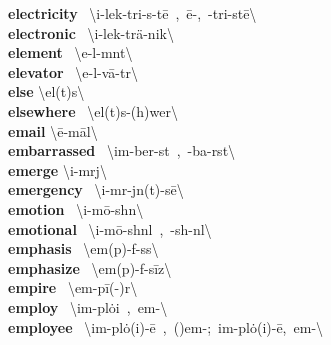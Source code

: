 \documentclass[10pt,a4paper]{article}
\begin{document}
\begin{multicols}{2}
\textbf{ electricity }\quad \ \textbackslash i-\textsecstress lek-\textprimstress tri-s\textschwa -t\={e}\ ,\ \={e}-,\ -\textprimstress tri-st\={e}\textbackslash \\
\textbf{ electronic }\quad \ \textbackslash i-\textsecstress lek-\textprimstress tr\"{a}-nik\textbackslash \\
\textbf{ element }\quad \ \textbackslash \textprimstress e-l\textschwa -m\textschwa nt\textbackslash \\
\textbf{ elevator }\quad \ \textbackslash \textprimstress e-l\textschwa -\textsecstress v\={a}-t\textschwa r\textbackslash \\
\textbf{ else }\quad \textbackslash \textprimstress el(t)s\textbackslash \\
\textbf{ elsewhere }\quad \ \textbackslash \textprimstress el(t)s-\textsecstress (h)wer\textbackslash \\
\textbf{ email }\quad \textbackslash \textprimstress \={e}-\textsecstress m\={a}l\textbackslash \\
\textbf{ embarrassed }\quad \ \textbackslash im-\textprimstress ber-\textschwa st\ ,\ -\textprimstress ba-r\textschwa st\textbackslash \\
\textbf{ emerge }\quad \textbackslash i-\textprimstress m\textschwa rj\textbackslash \\
\textbf{ emergency }\quad \ \textbackslash i-\textprimstress m\textschwa r-j\textschwa n(t)-s\={e}\textbackslash \\
\textbf{ emotion }\quad \ \textbackslash i-\textprimstress m\={o}-sh\textschwa n\textbackslash \\
\textbf{ emotional }\quad \ \textbackslash i-\textprimstress m\={o}-shn\textschwa l\ ,\ -sh\textschwa -n\textsuperscript{\textreve}l\textbackslash \\
\textbf{ emphasis }\quad \ \textbackslash \textprimstress em(p)-f\textschwa -s\textschwa s\textbackslash \\
\textbf{ emphasize }\quad \ \textbackslash \textprimstress em(p)-f\textschwa -\textsecstress s\={i}z\textbackslash \\
\textbf{ empire }\quad \ \textbackslash \textprimstress em-\textsecstress p\={i}(-\textschwa )r\textbackslash \\
\textbf{ employ }\quad \ \textbackslash im-\textprimstress pl\.{o}i\ ,\ em-\textbackslash \\
\textbf{ employee }\quad \ \textbackslash im-\textsecstress pl\.{o}(i)-\textprimstress \={e}\ ,\ (\textsecstress )em-;\ im-\textprimstress pl\.{o}(i)-\textsecstress \={e},\ em-\textbackslash \\

\end{multicols}
\end{document}
